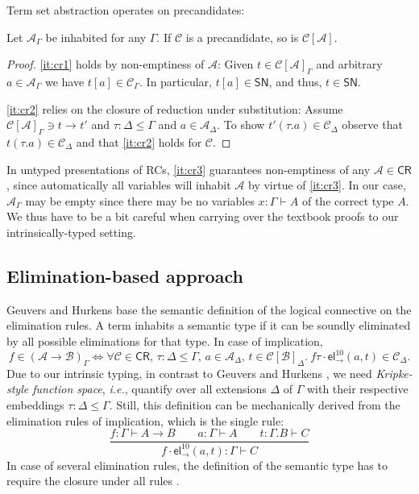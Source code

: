 \documentclass[a4paper,USenglish,cleveref, autoref, thm-restate]{lipics-v2021}
\newcommand{\ie}{\emph{i.e.}\xspace}
\newcommand{\ru}{\dfrac}
\newcommand{\tel}{\mathsf{el}}
\newcommand{\el}[2]{\ensuremath{\tel_{#1}^{#2}}}
\newcommand{\red}[1][]{\longrightarrow_{#1}}
\newcommand{\CR}{\mathsf{CR}}
\newcommand{\A}{\mathcal{A}}
\newcommand{\B}{\mathcal{B}}
\newcommand{\C}{\mathcal{C}}
\newcommand{\SN}{\mathsf{SN}}
\begin{document}
Term set abstraction operates on precandidates:
\begin{lemma}[Abstraction]
\label{lem:abs}
  Let $\A_\Gamma$ be inhabited for any $\Gamma$.
  If $\C$ is a precandidate, so is $\C[\A]$.
\end{lemma}
\begin{proof}
  \ref{it:cr1} holds by non-emptiness of $\A$:
  Given $t \in \C[\A]_\Gamma$ and
  arbitrary $a \in \A_\Gamma$ we have $t[a] \in \C_\Gamma$.  In
  particular, $t[a] \in \SN$, and thus, $t \in \SN$.

  \ref{it:cr2} relies on the closure of reduction
  under substitution:  Assume $\C[\A]_\Gamma \ni t \red t'$ and $\tau
  : \Delta \leq \Gamma$ and $a \in \A_\Delta$.  To show $t'(\tau.a)
  \in \C_\Delta$ observe that $t(\tau.a) \in \C_\Delta$ and that \ref{it:cr2}
  holds for $\C$.
\end{proof}

\begin{remark}
  In untyped presentations of RCs, \ref{it:cr3} guarantees
  non-emptiness of any $\A \in \CR$, since automatically all variables
  will inhabit $\A$ by virtue of \ref{it:cr3}.  In our case, $\A_\Gamma$
  may be empty since there may be no variables $x : \Gamma \vdash A$
  of the correct type $A$.  We thus have to be a bit careful when
  carrying over the textbook proofs
  \cite{girardLafontTaylor:proofsAndTypes}
  to our intrinsically-typed setting.
\end{remark}


\subsection{Elimination-based approach}
\label{sec:elimbased}

Geuvers and Hurkens \cite{geuversHurkens:types17} base the semantic
definition of the logical connective on the elimination rules.
A term inhabits a semantic type if it can be soundly eliminated by all
possible eliminations for that type.
In case of implication, %
\[
  f \in (\A \to \B)_\Gamma
  \iff
  \forall \C \in \CR, \,
  \tau : \Delta \leq \Gamma, \,
  a \in \A_\Delta, \,
  t \in \C[\B]_\Delta.\
  f\tau \cdot \el\to{10}(a,t) \in \C_\Delta .
\]
Due to our intrinsic typing,
in contrast to Geuvers and Hurkens \cite{geuversHurkens:types17},
we need \emph{Kripke-style function space}, \ie,
quantify over all extensions $\Delta$ of $\Gamma$ with
their respective embeddings $\tau : \Delta \leq \Gamma$.
Still, this definition can be mechanically derived from the elimination rules
of implication, which is the single rule:
\[
  \ru{f : \Gamma \vdash A \to B \qquad
      a : \Gamma \vdash A \qquad
      t : \Gamma.B \vdash C
    }{f \cdot \el\to{10}(a,t) : \Gamma \vdash C
    }
\]
In case of several elimination rules, the definition of the semantic
type has to require the closure under all rules \cite{geuversHurkens:types17}.
\end{document}
